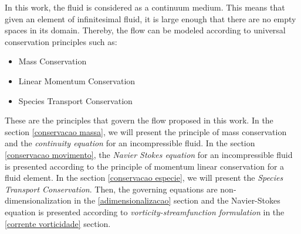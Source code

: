 In this work, the fluid is considered as a continuum medium. 
This means that given an element of infinitesimal fluid,
 it is large enough that there are no empty spaces
 in its domain. Thereby, the flow can be modeled
 according to universal conservation principles such as:

\begin{itemize}
 \item Mass Conservation
 \item Linear Momentum Conservation
 \item Species Transport Conservation
\end{itemize}

These are the principles that govern the flow proposed in this work.
 In the section \ref{conservacao massa}, we will present the principle
 of mass conservation and the \textit{continuity equation} for
 an incompressible fluid. In the section
 \ref{conservacao movimento}, the
 \textit{Navier Stokes equation} for an incompressible fluid
 is presented according to the principle of momentum linear conservation
 for a fluid element. In the section \ref{conservacao especie},
 we will present the \textit{Species Transport Conservation}.
 Then, the governing equations are non-dimensionalization
 in the \ref{adimensionalizacao} section and
 the Navier-Stokes equation is presented according to
 \textit{vorticity-streamfunction formulation} in the
 \ref{corrente vorticidade} section.
